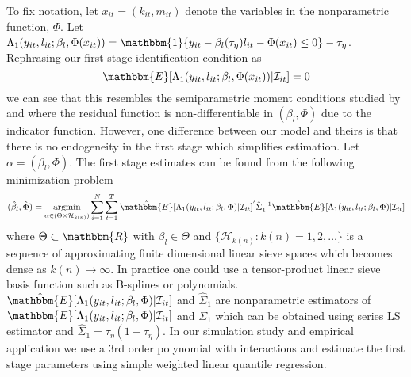 \documentclass[11pt]{article}
\begin{document}
To fix notation, let $x_{it}=(k_{it}, m_{it})$ denote the variables in the nonparametric function, $\Phi$. Let $\Lambda_{1}(y_{it}, l_{it}; \beta_{l}, \Phi(x_{it}))=\mathbbm{1}\{y_{it}-\beta_{l}(\tau_{\eta})l_{it}-\Phi(x_{it})\leq 0\}-\tau_{\eta}$. Rephrasing our first stage identification condition as 
\begin{equation} \label{residual}
\mathbbm{E}[\Lambda_{1}(y_{it}, l_{it}; \beta_{l}, \Phi(x_{it}))|\mathcal{I}_{it}]=0
\end{equation}
we can see that this resembles the semiparametric moment conditions studied by \cite{Chen2009} and \cite{Ai2012} where the residual function is non-differentiable in $(\beta_{l}, \Phi)$ due to the indicator function. However, one difference between our model and theirs is that there is no endogeneity in the first stage which simplifies estimation. Let $\alpha=(\beta_{l}, \Phi)$. The first stage estimates can be found from the following minimization problem
\begin{equation}
(\hat{\beta}_{l}, \hat{\Phi})=\underset{\alpha\in(\Theta\times \mathcal{H}_{k(n)})}{\operatorname{argmin}}\sum_{i=1}^{N}\sum_{t=1}^{T}\hat{\mathbbm{E}}[\Lambda_{1}(y_{it}, l_{it}; \beta_{l}, \Phi)|\mathcal{I}_{it}]^{'}\hat{\Sigma}_{1}^{-1}\hat{\mathbbm{E}}[\Lambda_{1}(y_{it}, l_{it}; \beta_{l}, \Phi)|\mathcal{I}_{it}]
\end{equation}
where $\Theta\subset \mathbbm{R}$ with $\beta_{l}\in\Theta$ and $\{\mathcal{H}_{k(n)}: k(n)=1,2,\dots\}$ is a sequence of approximating finite dimensional linear sieve spaces which becomes dense as $k(n)\rightarrow \infty$. In practice one could use a tensor-product linear sieve basis function such as B-splines or polynomials. $\hat{\mathbbm{E}}[\Lambda_{1}(y_{it}, l_{it}; \beta_{l}, \Phi)|\mathcal{I}_{it}]$ and $\hat{\Sigma}_{1}$ are nonparametric estimators of $\mathbbm{E}[\Lambda_{1}(y_{it}, l_{it}; \beta_{l}, \Phi)|\mathcal{I}_{it}]$ and $\Sigma_{1}$ which can be obtained using series LS estimator and $\hat{\Sigma}_{1}=\tau_{\eta}(1-\tau_{\eta})$. In our simulation study and empirical application we use a 3rd order polynomial with interactions and estimate the first stage parameters using simple weighted linear quantile regression.
\end{document}
